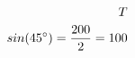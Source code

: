 \documentclass[preview]{standalone}
\begin{document}
\begin{align*}
\special{dvisvgm:raw <g id='unique000'>}T \\sin(45^{\circ}) = \frac{200}{2} = 100\special{dvisvgm:raw </g>}
\end{align*}
\end{document}
